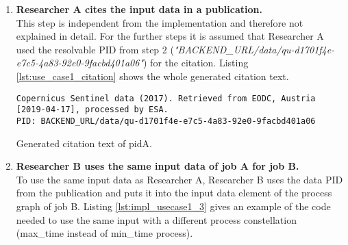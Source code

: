 \documentclass[draft,final]{vutinfth} %
\newenvironment{code}{\captionsetup{type=listing}}{}
\begin{document}
\begin{enumerate}
	{The user can get the resolvable data PID of the used input data by calling the "get\_data\_pid\_url" method. It contains the input data PID as a resolvable web address.} Figure \ref{fig:landing_page} shows the response data of the data PID information. After calling the page, the website provides the researcher with the filter parameters, the dataset identifier and a description of the dataset. Besides, the link to get the results of a query re-execution (see "Show Result" in Figure \ref{fig:landing_page}) and {a link to the machine actionable landing page in JSON format} are added to the page (see "JSON" button in Figure \ref{fig:landing_page}). {The machine actionable JSON pages for the result and the landing page are extensions to the core API of openEO. The resulting file list of the re-execution is accessible with the "BACKEND\_URL/data/data-PID/result" endpoint. The JSON format landing page is accessible at "BACKEND\_URL/data/data-PID/json". The user can retrieve the information of both endpoints via the Python client.}   \\
	The last three calls of the code block above show how the user can gather information about the input data directly in the Python client code.
	\item \textbf{Researcher A cites the input data in a publication.} \\
	This step is independent from the implementation and therefore not explained in detail. For the further steps it is assumed that Researcher A used the resolvable PID from step 2 (\textit{"BACKEND\_URL/data/qu-d1701f4e-e7c5-4a83-92e0-9facbd401a06"}) for the citation. {Listing \ref{lst:use_case1_citation} shows the whole generated citation text.}
\newpage
\begin{code}
	\begin{verbatim}
Copernicus Sentinel data (2017). Retrieved from EODC, Austria 
[2019-04-17], processed by ESA. 
PID: BACKEND_URL/data/qu-d1701f4e-e7c5-4a83-92e0-9facbd401a06
	\end{verbatim}
	\caption{Generated citation text of pidA.}
	\label{lst:use_case1_citation}
\end{code}

	 
	\item \textbf{Researcher B uses the same input data of job A for job B.} \\
	To use the same input data as Researcher A, Researcher B uses the data PID from the publication and puts it into the input data element of the process graph of job B. Listing \ref{lst:impl_usecase1_3} gives an example of the code needed to use the same input with a different process constellation (max\_time instead of min\_time process).  


\end{enumerate}
\end{document}
